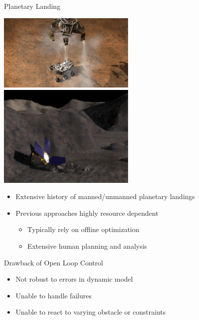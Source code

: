 \begin{frame}[t]{Planetary Landing} %
\begin{center}
    \includegraphics[width=0.5\textwidth,height=0.3\textheight,keepaspectratio]{figures/defense/curiosity.jpg} ~
    \includegraphics[width=0.5\textwidth,height=0.3\textheight,keepaspectratio]{figures/defense/430_new_landingnearstill.jpg}
\end{center}

\begin{itemize}
    \item Extensive history of manned/unmanned planetary landings
    \pause
    \item Previous approaches highly resource dependent
    \begin{itemize}
        \item Typically rely on offline optimization
        \item Extensive human planning and analysis
    \end{itemize}
\end{itemize}
\pause
\begin{block}{Drawback of Open Loop Control}
    \begin{itemize}
        \item Not robust to errors in dynamic model
        \item Unable to handle failures
        \item Unable to react to varying obstacle or constraints
    \end{itemize}
\end{block}

\end{frame} %

